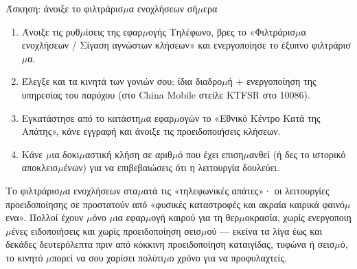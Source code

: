 \begin{tcbpractice}{Άσκηση: άνοιξε το φιλτράρισ$\mu$α ενοχλήσεων σή$\mu$ερα}
\begin{enumerate}
  \item Άνοιξε τις ρυθ$\mu$ίσεις της εφαρ$\mu$ογής Τηλέφωνο, βρες το «Φιλτράρισ$\mu$α ενοχλήσεων / Σίγαση αγνώστων κλήσεων» και ενεργοποίησε το έξυπνο φιλτράρισ$\mu$α.
  \item Έλεγξε και τα κινητά των γονιών σου: ίδια διαδρο$\mu$ή + ενεργοποίηση της υπηρεσίας του παρόχου (στο China Mobile στείλε KTFSR στο 10086).
  \item Εγκατάστησε από το κατάστη$\mu$α εφαρ$\mu$ογών το «Εθνικό Κέντρο Κατά της Απάτης», κάνε εγγραφή και άνοιξε τις προειδοποιήσεις κλήσεων.
  \item Κάνε $\mu$ια δοκι$\mu$αστική κλήση σε αριθ$\mu$ό που έχει επιση$\mu$ανθεί (ή δες το ιστορικό αποκλεισ$\mu$ένων) για να επιβεβαιώσεις ότι η λειτουργία δουλεύει.
\end{enumerate}

\end{tcbpractice}


Το φιλτράρισ$\mu$α ενοχλήσεων στα$\mu$ατά τις «τηλεφωνικές απάτες»· οι λειτουργίες προειδοποίησης σε προστατούν από «φυσικές καταστροφές και ακραία καιρικά φαινό$\mu$ενα». Πολλοί έχουν $\mu$όνο $\mu$ια εφαρ$\mu$ογή καιρού για τη θερ$\mu$οκρασία, χωρίς ενεργοποιη$\mu$ένες ειδοποιήσεις και χωρίς προειδοποίηση σεισ$\mu$ού — εκείνα τα λίγα έως και δεκάδες δευτερόλεπτα πριν από κόκκινη προειδοποίηση καταιγίδας, τυφώνα ή σεισ$\mu$ό, το κινητό $\mu$πορεί να σου χαρίσει πολύτι$\mu$ο χρόνο για να προφυλαχτείς.


